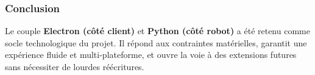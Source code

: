\subsubsection{Conclusion}

Le couple \textbf{Electron (côté client)} et \textbf{Python (côté robot)} a été retenu comme socle technologique du projet.  
Il répond aux contraintes matérielles, garantit une expérience fluide et multi-plateforme, et ouvre la voie à des extensions futures sans nécessiter de lourdes réécritures.
